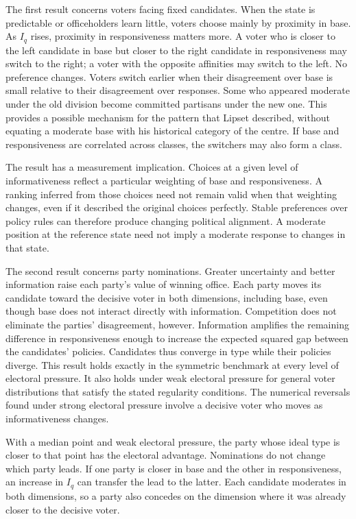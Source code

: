 \documentclass[12pt,letterpaper]{article}
\begin{document}
The first result concerns voters facing fixed candidates. When the state is predictable or officeholders learn little, voters choose mainly by proximity in base. As $I_q$ rises, proximity in responsiveness matters more. A voter who is closer to the left candidate in base but closer to the right candidate in responsiveness may switch to the right; a voter with the opposite affinities may switch to the left. No preference changes. Voters switch earlier when their disagreement over base is small relative to their disagreement over responses. Some who appeared moderate under the old division become committed partisans under the new one. This provides a possible mechanism for the pattern that Lipset described, without equating a moderate base with his historical category of the centre. If base and responsiveness are correlated across classes, the switchers may also form a class.

The result has a measurement implication. Choices at a given level of informativeness reflect a particular weighting of base and responsiveness. A ranking inferred from those choices need not remain valid when that weighting changes, even if it described the original choices perfectly. Stable preferences over policy rules can therefore produce changing political alignment. A moderate position at the reference state need not imply a moderate response to changes in that state.

The second result concerns party nominations. Greater uncertainty and better information raise each party's value of winning office. Each party moves its candidate toward the decisive voter in both dimensions, including base, even though base does not interact directly with information. Competition does not eliminate the parties' disagreement, however. Information amplifies the remaining difference in responsiveness enough to increase the expected squared gap between the candidates' policies. Candidates thus converge in type while their policies diverge. This result holds exactly in the symmetric benchmark at every level of electoral pressure. It also holds under weak electoral pressure for general voter distributions that satisfy the stated regularity conditions. The numerical reversals found under strong electoral pressure involve a decisive voter who moves as informativeness changes.

With a median point and weak electoral pressure, the party whose ideal type is closer to that point has the electoral advantage. Nominations do not change which party leads. If one party is closer in base and the other in responsiveness, an increase in $I_q$ can transfer the lead to the latter. Each candidate moderates in both dimensions, so a party also concedes on the dimension where it was already closer to the decisive voter.
\end{document}
